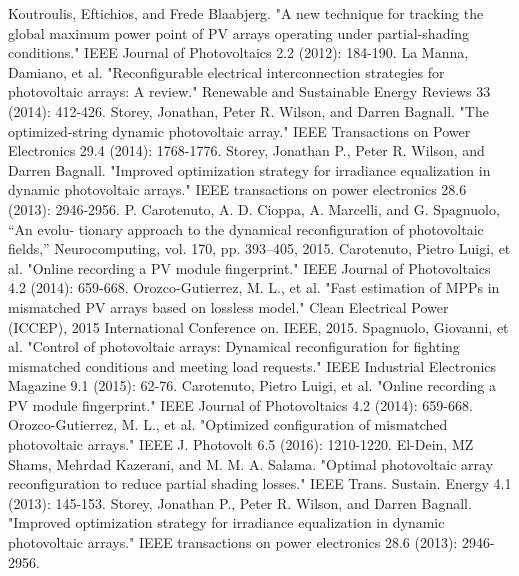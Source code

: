 \documentclass[conference]{IEEEtran}
\begin{document}
\begin{thebibliography}{00}
 Koutroulis, Eftichios, and Frede Blaabjerg. "A new technique for tracking the global maximum power point of PV arrays operating under partial-shading conditions." IEEE Journal of Photovoltaics 2.2 (2012): 184-190.
 La Manna, Damiano, et al. "Reconfigurable electrical interconnection strategies for photovoltaic arrays: A review." Renewable and Sustainable Energy Reviews 33 (2014): 412-426.
Storey, Jonathan, Peter R. Wilson, and Darren Bagnall. "The optimized-string dynamic photovoltaic array." IEEE Transactions on Power Electronics 29.4 (2014): 1768-1776.
 Storey, Jonathan P., Peter R. Wilson, and Darren Bagnall. "Improved optimization strategy for irradiance equalization in dynamic photovoltaic arrays." IEEE transactions on power electronics 28.6 (2013): 2946-2956.
 P. Carotenuto, A. D. Cioppa, A. Marcelli, and G. Spagnuolo, “An evolu- tionary approach to the dynamical reconfiguration of photovoltaic fields,” Neurocomputing, vol. 170, pp. 393–405, 2015.
 Carotenuto, Pietro Luigi, et al. "Online recording a PV module fingerprint." IEEE Journal of Photovoltaics 4.2 (2014): 659-668.
 Orozco-Gutierrez, M. L., et al. "Fast estimation of MPPs in mismatched PV arrays based on lossless model." Clean Electrical Power (ICCEP), 2015 International Conference on. IEEE, 2015.
 Spagnuolo, Giovanni, et al. "Control of photovoltaic arrays: Dynamical reconfiguration for fighting mismatched conditions and meeting load requests." IEEE Industrial Electronics Magazine 9.1 (2015): 62-76.
 Carotenuto, Pietro Luigi, et al. "Online recording a PV module fingerprint." IEEE Journal of Photovoltaics 4.2 (2014): 659-668.
 Orozco-Gutierrez, M. L., et al. "Optimized configuration of mismatched photovoltaic arrays." IEEE J. Photovolt 6.5 (2016): 1210-1220.
 El-Dein, MZ Shams, Mehrdad Kazerani, and M. M. A. Salama. "Optimal photovoltaic array reconfiguration to reduce partial shading losses." IEEE Trans. Sustain. Energy 4.1 (2013): 145-153.
 Storey, Jonathan P., Peter R. Wilson, and Darren Bagnall. "Improved optimization strategy for irradiance equalization in dynamic photovoltaic arrays." IEEE transactions on power electronics 28.6 (2013): 2946-2956.
  
\end{thebibliography}
\end{document}
